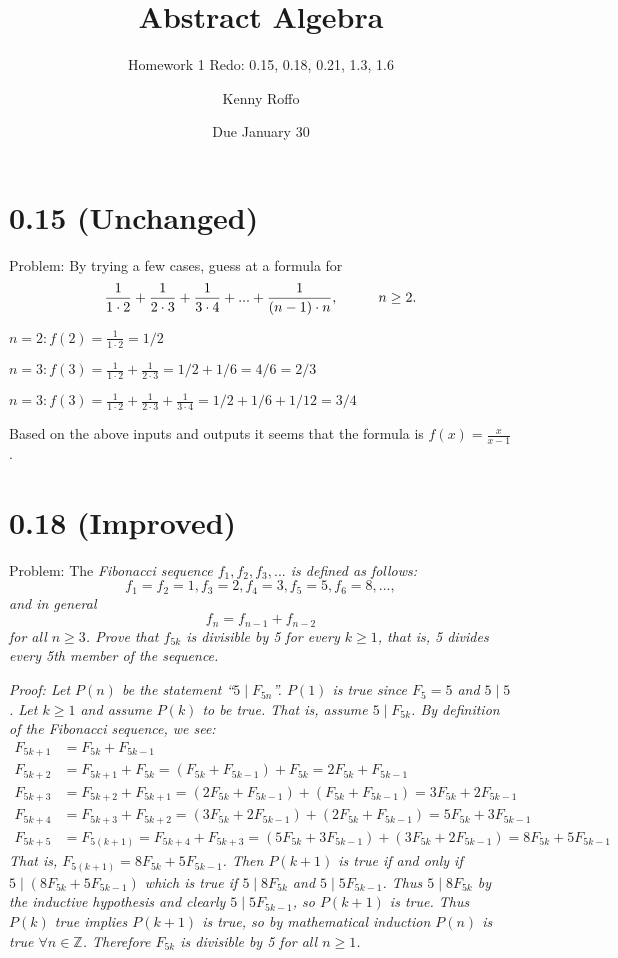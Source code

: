 \documentclass{scrartcl}
\title{Abstract Algebra}
\subtitle{Homework 1 Redo: 0.15, 0.18, 0.21, 1.3, 1.6}
\author{Kenny Roffo}
\date{Due January 30}
\begin{document}
\maketitle

\section{0.15 (Unchanged)}
Problem: By trying a few cases, guess at a formula for \[\frac{1}{1\cdot2}+\frac{1}{2\cdot3}+\frac{1}{3\cdot4}+...+\frac{1}{(n-1)\cdot n}, \hspace{1 cm} n\geq2.\]

$n=2: f(2)=\frac{1}{1\cdot2}=1/2$ \newline

$n=3: f(3)=\frac{1}{1\cdot2}+\frac{1}{2\cdot3}=1/2+1/6=4/6=2/3$ \newline

$n=3: f(3)=\frac{1}{1\cdot2}+\frac{1}{2\cdot3}+\frac{1}{3\cdot4}=1/2+1/6+1/12=3/4$ \newline

Based on the above inputs and outputs it seems that the formula is $f(x)=\frac{x}{x-1}$.

\section{0.18 (Improved)}
Problem: The \em Fibonacci sequence \em $f_1,f_2,f_3,...$ is defined as follows: \[f_1=f_2=1, f_3=2, f_4=3, f_5=5, f_6=8,...,\] and in general
\[f_n=f_{n-1}+f_{n-2}\] for all $n\geq3$. Prove that $f_{5k}$ is divisible by 5 for every $k\geq1$, that is, 5 divides every 5th member of the sequence. \newline \newline

\em Proof: \em Let $P(n)$ be the statement ``$ 5\mid F_{5n}$''. $P(1)$ is true since $F_5=5$ and $5\mid 5$. Let $k\geq1$ and assume $P(k)$ to be true. That is, assume $5\mid F_{5k}$. By definition of the Fibonacci sequence, we see: 
\begin{align*}
F_{5k+1}&=F_{5k}+F_{5k-1}\\
F_{5k+2}&=F_{5k+1}+F_{5k}=(F_{5k}+F_{5k-1})+F_{5k}=2F_{5k}+F_{5k-1}\\
F_{5k+3}&=F_{5k+2}+F_{5k+1}=(2F_{5k}+F_{5k-1})+(F_{5k}+F_{5k-1})=3F_{5k}+2F_{5k-1}\\
F_{5k+4}&=F_{5k+3}+F_{5k+2}=(3F_{5k}+2F_{5k-1})+(2F_{5k}+F_{5k-1})=5F_{5k}+3F_{5k-1}\\
F_{5k+5}&=F_{5(k+1)}=F_{5k+4}+F_{5k+3}=(5F_{5k}+3F_{5k-1})+(3F_{5k}+2F_{5k-1})=8F_{5k}+5F_{5k-1}
\end{align*}
That is, $F_{5(k+1)}=8F_{5k}+5F_{5k-1}$. Then $P(k+1)$ is true if and only if $5\mid (8F_{5k}+5F_{5k-1})$ which is true if $5\mid 8F_{5k}$ and $5\mid 5F_{5k-1}$. Thus $5\mid 8F_{5k}$ by the inductive hypothesis and clearly $5\mid 5F_{5k-1}$, so $P(k+1)$ is true. Thus $P(k)$ true implies $P(k+1)$ is true, so by mathematical induction $P(n)$ is true $\forall n \in \mathbb{Z}$. Therefore $F_{5k}$ is divisible by 5 for all $n\geq 1$.
\end{document}
